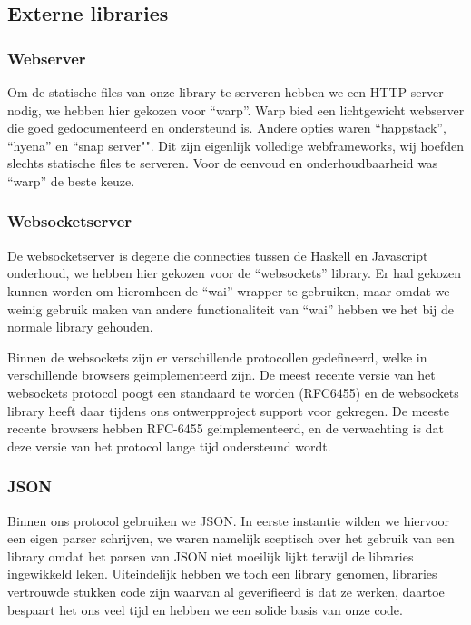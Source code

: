 \subsection{Externe libraries}

\subsubsection{Webserver}
Om de statische files van onze library te serveren hebben we een HTTP-server nodig, we hebben hier gekozen voor ``warp''. Warp bied een lichtgewicht webserver die goed gedocumenteerd en ondersteund is. Andere opties waren ``happstack'', ``hyena'' en ``snap server"". Dit zijn eigenlijk volledige webframeworks, wij hoefden slechts statische files te serveren. Voor de eenvoud en onderhoudbaarheid was ``warp'' de beste keuze.

\subsubsection{Websocketserver}
De websocketserver is degene die connecties tussen de Haskell en Javascript onderhoud, we hebben hier gekozen voor de ``websockets'' library. Er had gekozen kunnen worden om hieromheen de ``wai'' wrapper te gebruiken, maar omdat we weinig gebruik maken van andere functionaliteit van ``wai'' hebben we het bij de normale library gehouden.

Binnen de websockets zijn er verschillende protocollen gedefineerd, welke in verschillende browsers geimplementeerd zijn. De meest recente versie van het websockets protocol poogt een standaard te worden (RFC6455) en de websockets library heeft daar tijdens ons ontwerpproject support voor gekregen. De meeste recente browsers hebben RFC-6455 geimplementeerd, en de verwachting is dat deze versie van het protocol lange tijd ondersteund wordt.

\subsubsection{JSON}
Binnen ons protocol gebruiken we JSON. In eerste instantie wilden we hiervoor een eigen parser schrijven, we waren namelijk sceptisch over het gebruik van een library omdat het parsen van JSON niet moeilijk lijkt terwijl de libraries ingewikkeld leken. Uiteindelijk hebben we toch een library genomen, libraries vertrouwde stukken code zijn waarvan al geverifieerd is dat ze werken, daartoe bespaart het ons veel tijd en hebben we een solide basis van onze code.

